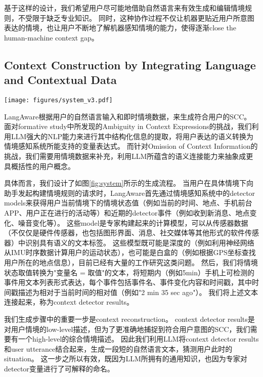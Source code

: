 基于这样的设计，我们希望用户尽可能地借助自然语言来有效生成和编辑情境规则，不受限于缺乏专业知识。
同时，这种协作过程不仅让机器更贴近用户所意图表达的情境，也让用户不断地了解机器感知情境的能力，使得逐渐close the human-machine context gap。


\subsection{Context Construction by Integrating Language and Contextual Data}
\label{sec:context_generate}

\begin{figure*}
    \centering
    \texttt{[image: figures/system\_v3.pdf]}
    \caption{The generation process of Shared Contextual Concepts. 绿色箭头代表是用户自然语言的数据流，黄色箭头代表情境感知的数据流，他们最终合并成为了Shared Contextual Concepts。蓝色框的步骤由LLM驱动。}
    \label{fig:system}
\end{figure*}

LangAware根据用户的自然语言输入和即时情境数据，来生成符合用户的SCC。
面对formative study中所发现的Ambiguity in Context Expressions的挑战，我们利用LLM强大的NLP能力来进行其中结构化信息的提取，将用户表达的语义转换为情境感知系统所能支持的变量表达式。
而针对Omission of Context Information的挑战，我们需要用情境数据来补充，利用LLM所蕴含的语义连接能力来抽象成更具概括性的用户概念。

具体而言，我们设计了如图\ref{fig:system}所示的生成流程。
当用户在具体情境下向助手发起构建情境规则的请求时，LangAware首先通过情境感知系统中的detector models来获得用户当前情境下的情境状态值（例如当前的时间、地点、手机前台APP、用户正在进行的活动等）和近期的detector事件（例如收到新消息、地点变化、噪音变化等）。
这些model是专家构建起来的计算模型，可以从传感器数据（不仅仅是硬件传感器，也包括图形界面、消息、社交媒体等其他形式的软件传感器）中识别具有语义的文本标签。
这些模型既可能是深度的（例如利用神经网络从IMU时序数据计算用户的运动状态），也可能是白盒的（例如根据GPS坐标查找用户所在的地点信息），目前已经有大量的工作研究这类问题\cite{perera_context_2014,chen_deep_2021,ismail_fawaz_deep_2019,sarker_context-aware_2019}。
然后，我们将情境状态取值转换为"变量名 = 取值"的文本，将短期内（例如5min）手机上可检测的事件用文本列表形式表达，每个事件包括事件名、事件变化内容和时间戳，其中时间戳描述为相对于当前时间的相对值（例如"2 min 35 sec ago"）。
我们将上述文本连接起来，称为context detector results。

我们生成步骤中的重要一步是context reconstruction。
context detector results是对用户情境的low-level描述，但为了更准确地捕捉到符合用户意图的SCC，我们需要有一个high-level的综合情境描述。
因此我们利用LLM将context detector results和user utterance结合起来，生成一段短的自然语言文本，猜测用户此时的situation。
这一步之所以有效，既因为LLM所拥有的通用知识，也因为专家对detector变量进行了可解释的命名。


